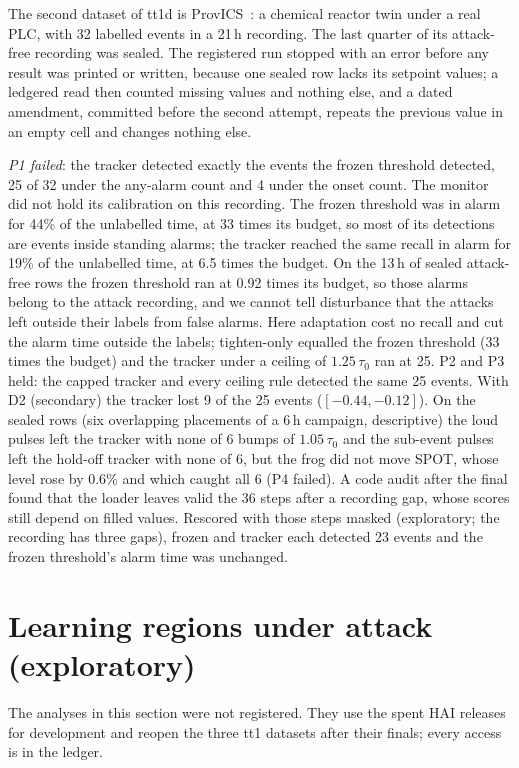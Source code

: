\documentclass[letterpaper,twocolumn,10pt]{article}
\begin{document}
The second dataset of tt1d is ProvICS~\cite{shibbir2026provics}: a chemical reactor twin under a real
PLC, with 32 labelled events in a 21\,h recording. The last quarter of its attack-free recording was
sealed. The registered run stopped with an error before any result was printed or written, because one
sealed row lacks its setpoint values; a ledgered read then counted missing values and nothing else, and a dated
amendment, committed before the second attempt, repeats the previous value in an empty cell and changes
nothing else.

\emph{P1 failed}: the tracker detected exactly the events the frozen threshold detected, 25 of 32
under the any-alarm count and 4 under the onset count. The monitor did not hold its calibration on
this recording. The frozen threshold was in alarm for 44\% of the unlabelled time, at 33 times its
budget, so most of its detections are events inside standing alarms; the tracker reached the same
recall in alarm for 19\% of the unlabelled time, at 6.5 times the budget. On the 13\,h of sealed
attack-free rows the frozen threshold ran at 0.92 times its budget, so those alarms belong to the attack
recording, and we cannot tell disturbance that the attacks left outside their labels from false alarms.
Here adaptation cost no recall and cut the alarm time outside the labels; tighten-only equalled the
frozen threshold (33 times the budget) and the tracker under a ceiling of $1.25\,\tau_0$ ran at 25. P2
and P3 held: the capped tracker and every ceiling rule detected the same 25 events. With D2
(secondary) the tracker lost 9 of the 25 events ($[-0.44, -0.12]$). On
the sealed rows (six overlapping placements of a 6\,h campaign, descriptive) the loud pulses left the
tracker with none of 6 bumps of $1.05\,\tau_0$ and the sub-event pulses left the hold-off tracker with
none of 6, but the frog did not move SPOT, whose level rose by 0.6\% and which caught all 6 (P4 failed).
A code audit after the final found that the loader leaves valid the 36 steps after a recording gap,
whose scores still depend on filled values. Rescored with those steps masked (exploratory; the
recording has three gaps), frozen and tracker each detected 23 events and the frozen threshold's alarm
time was unchanged.

\section{Learning regions under attack (exploratory)}
\label{sec:regions}

The analyses in this section were not registered. They use the spent HAI releases for development
and reopen the three tt1 datasets after their finals; every access is in the ledger.
\end{document}
